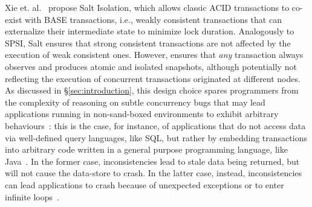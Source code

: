 

Xie et. al.~\cite{xie2014salt} propose Salt Isolation, which allows classic ACID transactions to co-exist with BASE transactions, i.e., weakly consistent transactions that can externalize their intermediate state to minimize lock duration. Analogously to SPSI, Salt ensures that strong consistent transactions are not affected by the execution of weak consistent ones. However,  \specula ensures that \textit{any} transaction always observes and produces atomic and isolated snapshots, although potentially not reflecting the execution of concurrent transactions originated at different nodes. As discussed in \S \ref{sec:introduction}, this design choice spares programmers from the complexity of reasoning on subtle concurrency bugs that may lead applications running in non-sand-boxed environments  to exhibit arbitrary behaviours~\cite{guerraoui2007opacity, imbs2012virtual}: this is the case, for instance, of applications that do not access data via well-defined query languages, like SQL, but rather by embedding transactions into arbitrary code written in a general purpose programming language, like Java~\cite{javaPersistenceAPI}. In the former case, inconsistencies lead to stale data being returned, but will not cause the data-store to crash. In the latter case, instead, inconsistencies can lead applications to crash because of unexpected exceptions or to enter infinite loops~\cite{felber2008transactions}. 



